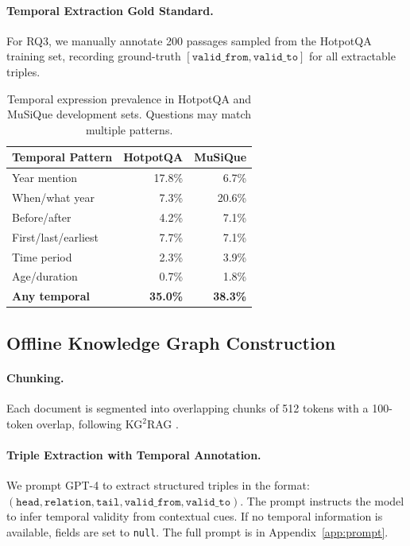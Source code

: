 \documentclass[11pt]{article}
\begin{document}
\paragraph{Temporal Extraction Gold Standard.}
For RQ3, we manually annotate 200 passages sampled from the HotpotQA
training set, recording ground-truth $[\mathtt{valid\_from},
\mathtt{valid\_to}]$ for all extractable triples.

\begin{table}[t]
  \centering
  \small
  \begin{tabular}{lrr}
    \toprule
    \textbf{Temporal Pattern} & \textbf{HotpotQA} & \textbf{MuSiQue} \\
    \midrule
    Year mention        & 17.8\% & 6.7\%  \\
    When/what year      & 7.3\%  & 20.6\% \\
    Before/after        & 4.2\%  & 7.1\%  \\
    First/last/earliest & 7.7\%  & 7.1\%  \\
    Time period         & 2.3\%  & 3.9\%  \\
    Age/duration        & 0.7\%  & 1.8\%  \\
    \midrule
    \textbf{Any temporal} & \textbf{35.0\%} & \textbf{38.3\%} \\
    \bottomrule
  \end{tabular}
  \caption{Temporal expression prevalence in HotpotQA and MuSiQue
  development sets. Questions may match multiple patterns.}
  \label{tab:eda}
\end{table}

\subsection{Offline Knowledge Graph Construction}

\paragraph{Chunking.}
Each document is segmented into overlapping chunks of 512 tokens with a
100-token overlap, following KG$^2$RAG \cite{zhu2025kg2rag}.

\paragraph{Triple Extraction with Temporal Annotation.}
We prompt GPT-4 to extract structured triples in the format:
$(\mathtt{head}, \mathtt{relation}, \mathtt{tail},
\mathtt{valid\_from}, \mathtt{valid\_to})$. The prompt instructs the model
to infer temporal validity from contextual cues. If no temporal information is
available, fields are set to \texttt{null}. The full prompt is in
Appendix~\ref{app:prompt}.
\end{document}
